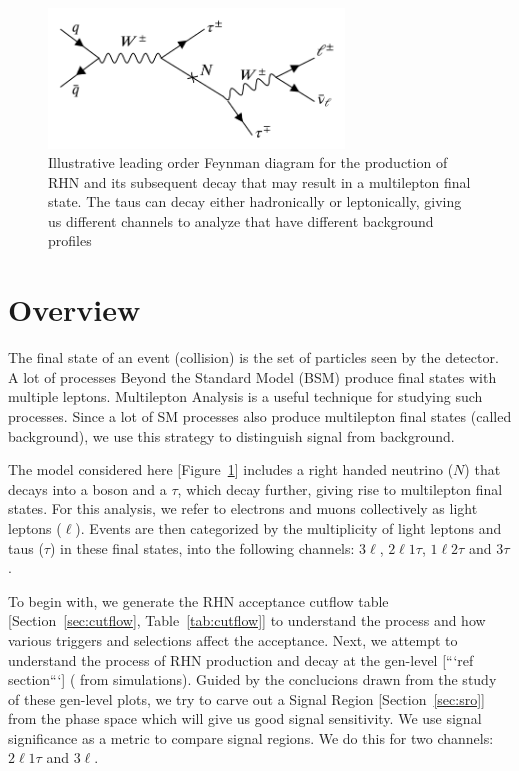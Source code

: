 \documentclass[letterpaper,12pt]{article}
\begin{document}
\begin{figure}[h!]
  \includegraphics[width=0.7\textwidth, center]{RHNfeynman.png}
  \caption{Illustrative leading order Feynman diagram for the production of RHN and its subsequent decay that may result in a multilepton final state. The taus can decay either hadronically or leptonically, giving us different channels to analyze that have different background profiles}
  \label{fig:rhnfeyn}
\end{figure}

\section{Overview}
\label{sec:overview}

The final state of an event (collision) is the set of particles seen by the detector. A lot of processes Beyond the Standard Model (BSM) produce final states with multiple leptons.  Multilepton Analysis is a useful technique for studying such processes. Since a lot of SM processes also produce multilepton final states (called background), we use this strategy to distinguish signal from background.

The model considered here [Figure~\ref{fig:rhnfeyn}] includes a right handed neutrino ($N$) that decays into a \Wboson{} boson and a $\tau$, which decay further, giving rise to multilepton final states. For this analysis, we refer to electrons and muons collectively as light leptons ($\ell$). Events are then categorized by the multiplicity of light leptons and taus ($\tau$) in these final states, into the following channels: $3\ell$, $2\ell1\tau$, $1\ell2\tau$ and $3\tau$.

To begin with, we generate the RHN acceptance cutflow table [Section~\ref{sec:cutflow}, Table~\ref{tab:cutflow}] to understand the process and how various triggers and selections affect the acceptance. Next, we attempt to understand the process of RHN production and decay at the gen-level [```ref section```] (\ie{} from simulations). Guided by the conclucions drawn from the study of these gen-level plots, we try to carve out a Signal Region [Section~\ref{sec:sro}] from the phase space which will give us good signal sensitivity. We use signal significance as a metric to compare signal regions. We do this for two channels: $2\ell1\tau$ and $3\ell$.
\end{document}
